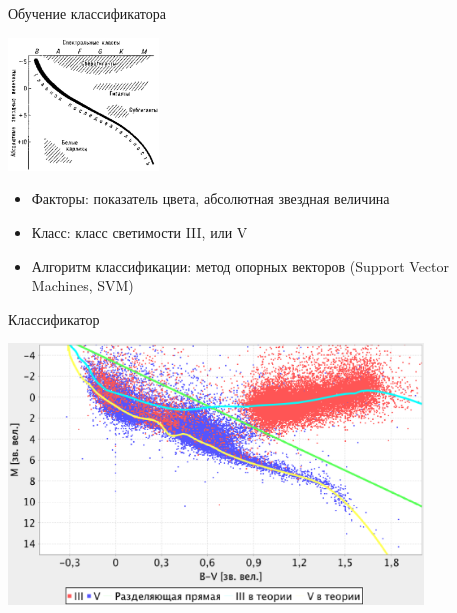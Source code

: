 \documentclass[14pt, fleqn, xcolor={dvipsnames, table}]{beamer}
\begin{document}
        \begin{frame}{Обучение классификатора}
            \begin{center}
                \includegraphics[width=4cm]{gr-example.eps}
            \end{center}
           
            \begin{itemize}
                \item Факторы: показатель цвета, абсолютная звездная величина
                \item Класс: класс светимости III, или V
                \item Алгоритм классификации: метод опорных векторов (Support Vector Machines, SVM)
            \end{itemize}
        \end{frame}        
        
        \begin{frame}{Классификатор}
            \begin{center}
                \includegraphics[width=11cm]{classify.eps}
            \end{center}             
        \end{frame}
        
\end{document}
